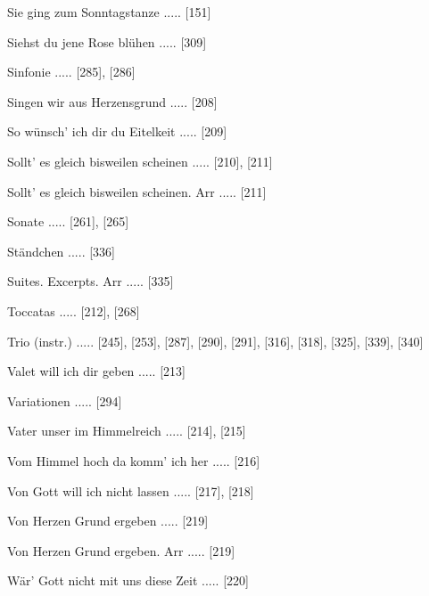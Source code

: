 \documentclass[twocolumn, 12pt]{book}
\begin{document}
\newline 
Sie ging zum Sonntagstanze ..... [151]

\newline 
Siehst du jene Rose blühen ..... [309]

\newline 
Sinfonie ..... [285], [286]

\newline 
Singen wir aus Herzensgrund ..... [208]

\newline 
So wünsch' ich dir du Eitelkeit ..... [209]

\newline 
Sollt' es gleich bisweilen scheinen ..... [210], [211]

\newline 
Sollt' es gleich bisweilen scheinen. Arr ..... [211]

\newline 
Sonate ..... [261], [265]

\newline 
Ständchen ..... [336]

\newline 
Suites. Excerpts. Arr ..... [335]

\newline 
Toccatas ..... [212], [268]

\newline 
Trio (instr.) ..... [245], [253], [287], [290], [291], [316], [318], [325], [339], [340]

\newline 
Valet will ich dir geben ..... [213]

\newline 
Variationen ..... [294]

\newline 
Vater unser im Himmelreich ..... [214], [215]

\newline 
Vom Himmel hoch da komm' ich her ..... [216]

\newline 
Von Gott will ich nicht lassen ..... [217], [218]

\newline 
Von Herzen Grund ergeben ..... [219]

\newline 
Von Herzen Grund ergeben. Arr ..... [219]

\newline 
Wär' Gott nicht mit uns diese Zeit ..... [220]
\end{document}
